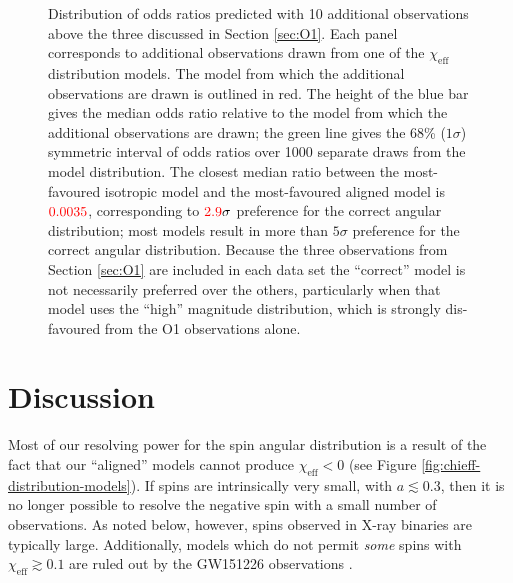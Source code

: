 \documentclass[modern,linenumbers]{aastex61}
\newcommand{\chieff}{\chi_\mathrm{eff}}
\newcommand{\checkme}[1]{\textcolor{red}{#1}}
\newcommand{\OTwoSigmaIsoAlignedMin}{\checkme{2.9}}
\newcommand{\OTwoOddsIsoAlignedMin}{\checkme{0.0035}}
\begin{document}
\begin{figure}
  \caption{\label{fig:O2-predictions} Distribution of odds ratios
    predicted with 10 additional observations above the three
    discussed in Section \ref{sec:O1}.  Each panel corresponds to
    additional observations drawn from one of the $\chieff$
    distribution models.  The model from which the additional
    observations are drawn is outlined in red.  The height of the blue
    bar gives the median odds ratio relative to the model from which
    the additional observations are drawn; the green line gives the
    68\% ($1 \sigma$) symmetric interval of odds ratios over 1000
    separate draws from the model distribution.  The closest median
    ratio between the most-favoured isotropic model and the
    most-favoured aligned model is $\OTwoOddsIsoAlignedMin$,
    corresponding to $\OTwoSigmaIsoAlignedMin\sigma$ preference for
    the correct angular distribution; most models result in more than
    $5\sigma$ preference for the correct angular distribution.
    Because the three observations from Section \ref{sec:O1} are
    included in each data set the ``correct'' model is not necessarily
    preferred over the others, particularly when that model uses the
    ``high'' magnitude distribution, which is strongly dis-favoured
    from the O1 observations alone.}
\end{figure}

\section{Discussion}
\label{sec:discussion}

Most of our resolving power for the spin angular distribution is a
result of the fact that our ``aligned'' models cannot produce
$\chieff < 0$ (see Figure \ref{fig:chieff-distribution-models}).  If
spins are intrinsically very small, with $a \lesssim 0.3$, then it is
no longer possible to resolve the negative spin with a small number of
observations.  As noted below, however, spins observed in X-ray
binaries are typically large.  Additionally, models which do not
permit \emph{some} spins with $\chieff \gtrsim 0.1$ are ruled out by
the GW151226 observations \citep{2016PhRvL.116x1103A}.
\end{document}
